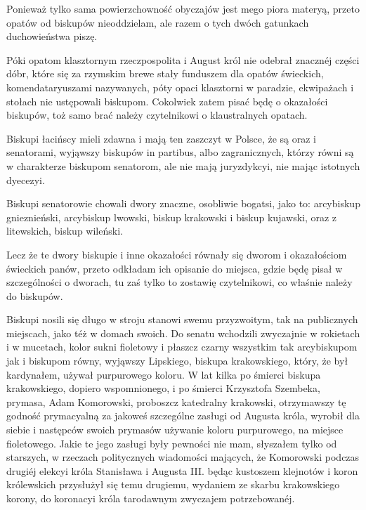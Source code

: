 \documentclass{book}
\begin{document}
Ponieważ tylko sama powierzchowność obyczajów jest mego piora materyą, przeto opatów od biskupów nieoddzielam, ale razem o tych dwóch gatunkach duchowieństwa piszę.

Póki opatom klasztornym rzeczpospolita i August król nie odebrał znacznéj części dóbr, które się za rzymskim brewe stały funduszem dla opatów świeckich, komendataryuszami nazywanych, póty opaci klasztorni w paradzie, ekwipażach i stołach nie ustępowali biskupom. Cokolwiek zatem pisać będę o okazałości biskupów, toż samo brać należy czytelnikowi o klaustralnych opatach.

Biskupi łacińscy mieli zdawna i mają ten zaszczyt w Polsce, że są oraz i senatorami, wyjąwszy biskupów in partibus, albo zagranicznych, którzy równi są w charakterze biskupom senatorom, ale nie mają juryzdykcyi, nie mając istotnych dyecezyi.

Biskupi senatorowie chowali dwory znaczne, osobliwie bogatsi, jako to: arcybiskup gnieznieński, arcybiskup lwowski, biskup krakowski i biskup kujawski, oraz z litewskich, biskup wileński.

Lecz że te dwory biskupie i inne okazałości równały się dworom i okazałościom świeckich panów, przeto odkładam ich opisanie do miejsca, gdzie będę pisał w szczególności o dworach, tu zaś tylko to zostawię czytelnikowi, co właśnie należy do biskupów.

Biskupi nosili się długo w stroju stanowi swemu przyzwoitym, tak na publicznych miejscach, jako téż w domach swoich. Do senatu wchodzili zwyczajnie w rokietach i w mucetach, kolor sukni fioletowy i płaszcz czarny wszystkim tak arcybiskupom jak i biskupom równy, wyjąwszy Lipskiego, biskupa krakowskiego, który, że był kardynałem, używał purpurowego koloru. W lat kilka po śmierci biskupa krakowskiego, dopiero wspomnionego, i po śmierci Krzysztofa Szembeka, prymasa, Adam Komorowski, proboszcz katedralny krakowski, otrzymawszy tę godność prymacyalną za jakoweś szczególne zasługi od Augusta króla, wyrobił dla siebie i następców swoich prymasów używanie koloru purpurowego, na miejsce fioletowego. Jakie te jego zasługi były pewności nie mam, słyszałem tylko od starszych, w rzeczach politycznych wiadomości mających, że Komorowski podczas drugiéj elekcyi króla Stanisława i Augusta III. będąc kustoszem klejnotów i koron królewskich przysłużył się temu drugiemu, wydaniem ze skarbu krakowskiego korony, do koronacyi króla 
tarodawnym zwyczajem potrzebowanéj.
\end{document}
